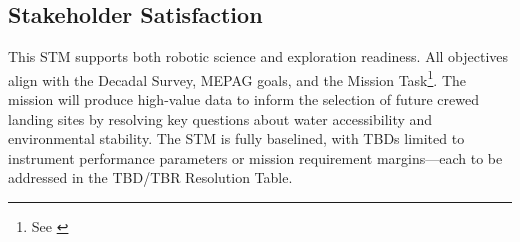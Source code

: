 \subsection*{Stakeholder Satisfaction}

This STM supports both robotic science and exploration readiness. All objectives align with the Decadal Survey, MEPAG goals, and the Mission Task\footnote{See \cite{nrc_2022_decadal, mepag_goals, lspace_stm_module}}. The mission will produce high-value data to inform the selection of future crewed landing sites by resolving key questions about water accessibility and environmental stability. The STM is fully baselined, with TBDs limited to instrument performance parameters or mission requirement margins—each to be addressed in the TBD/TBR Resolution Table.




